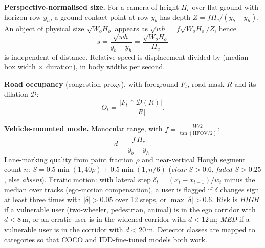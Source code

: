 \documentclass[11pt,a4paper]{article}
\begin{document}
\textbf{Perspective-normalised size.} For a camera of height $H_c$ over flat ground with horizon row $y_h$, a ground-contact point at row $y_b$ has depth $Z=fH_c/(y_b-y_h)$.
An object of physical size $\sqrt{W_oH_o}$ appears as $\sqrt{wh}=f\sqrt{W_oH_o}/Z$, hence
\begin{equation}
s=\frac{\sqrt{wh}}{y_b-y_h}=\frac{\sqrt{W_oH_o}}{H_c}
\end{equation}
is independent of distance. Relative speed is displacement divided by (median box width $\times$ duration), in body widths per second.

\textbf{Road occupancy} (congestion proxy), with foreground $F_t$, road mask $R$ and its dilation $\mathcal{D}$:
\begin{equation}
O_t=\frac{|F_t\cap\mathcal{D}(R)|}{|R|}.
\end{equation}

\textbf{Vehicle-mounted mode.} Monocular range, with $f=\tfrac{W/2}{\tan(\mathrm{HFOV}/2)}$:
\begin{equation}
d=\frac{f\,H_c}{y_b-y_h}.
\end{equation}
Lane-marking quality from paint fraction $\rho$ and near-vertical Hough segment count $n$: $S=0.5\min(1,40\rho)+0.5\min(1,n/6)$
(\emph{clear} $S>0.6$, \emph{faded} $S>0.25$, else \emph{absent}).
Erratic motion: with lateral step $\delta_t=(x_t-x_{t-1})/w_t$ minus the median over tracks (ego-motion compensation), a user is flagged if
$\delta$ changes sign at least three times with $\overline{|\delta|}>0.05$ over 12 steps, or $\max|\delta|>0.6$.
Risk is \emph{HIGH} if a vulnerable user (two-wheeler, pedestrian, animal) is in the ego corridor with $d<8$\,m, or an erratic user is in the
widened corridor with $d<12$\,m; \emph{MED} if a vulnerable user is in the corridor with $d<20$\,m.
Detector classes are mapped to categories so that COCO and IDD-fine-tuned models both work.

\end{document}
